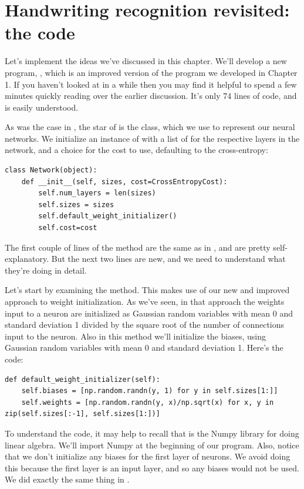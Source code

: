\documentclass[a4paper,twoside,10pt]{book}
\begin{document}
\section{Handwriting recognition revisited: the code}
\label{sec:3.4}
Let's implement the ideas we've discussed in this chapter. We'll develop a new program, , which is an improved version of the program  we developed in Chapter 1. If you haven't looked at  in a while then you may find it helpful to spend a few minutes quickly reading over the earlier discussion. It's only 74 lines of code, and is easily understood.

As was the case in , the star of  is the  class, which we use to represent our neural networks. We initialize an instance of  with a list of  for the respective layers in the network, and a choice for the cost to use, defaulting to the cross-entropy:
\begin{lstlisting}
class Network(object):
	def __init__(self, sizes, cost=CrossEntropyCost):
		self.num_layers = len(sizes)
		self.sizes = sizes
		self.default_weight_initializer()
		self.cost=cost
\end{lstlisting}
The first couple of lines of the  method are the same as in , and are pretty self-explanatory. But the next two lines are new, and we need to understand what they're doing in detail.

Let's start by examining the  method. This makes use of our new and improved approach to weight initialization. As we've seen, in that approach the weights input to a neuron are initialized as Gaussian random variables with mean 0 and standard deviation 1 divided by the square root of the number of connections input to the neuron. Also in this method we'll initialize the biases, using Gaussian random variables with mean 0 and standard deviation 1. Here's the code:
\begin{lstlisting}
def default_weight_initializer(self):
	self.biases = [np.random.randn(y, 1) for y in self.sizes[1:]]
	self.weights = [np.random.randn(y, x)/np.sqrt(x) for x, y in zip(self.sizes[:-1], self.sizes[1:])]
\end{lstlisting}
To understand the code, it may help to recall that  is the Numpy library for doing linear algebra. We'll import Numpy at the beginning of our program. Also, notice that we don't initialize any biases for the first layer of neurons. We avoid doing this because the first layer is an input layer, and so any biases would not be used. We did exactly the same thing in .
\end{document}
